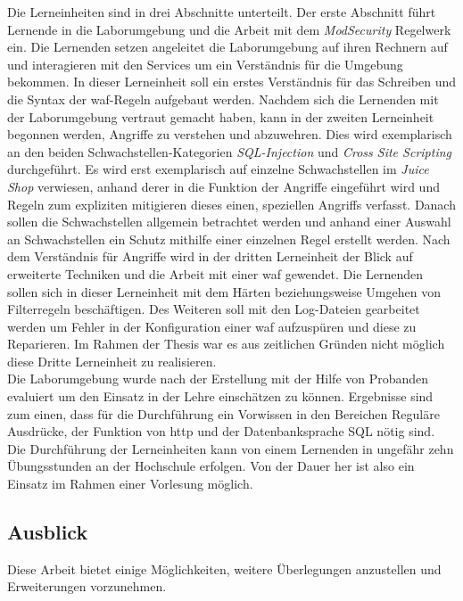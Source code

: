 Die Lerneinheiten sind in drei Abschnitte unterteilt.
Der erste Abschnitt führt Lernende in die Laborumgebung und die Arbeit mit dem \textit{ModSecurity} Regelwerk ein.
Die Lernenden setzen angeleitet die Laborumgebung auf ihren Rechnern auf und interagieren mit den Services um ein Verständnis für die Umgebung bekommen.
In dieser Lerneinheit soll ein erstes Verständnis für das Schreiben und die Syntax der \ac{waf}-Regeln aufgebaut werden.
Nachdem sich die Lernenden mit der Laborumgebung vertraut gemacht haben, kann in der zweiten Lerneinheit begonnen werden, Angriffe zu verstehen und abzuwehren.
Dies wird exemplarisch an den beiden Schwachstellen-Kategorien \textit{SQL-Injection} und \textit{Cross Site Scripting} durchgeführt.
Es wird erst exemplarisch auf einzelne Schwachstellen im \textit{Juice Shop} verwiesen, anhand derer in die Funktion der Angriffe eingeführt wird und Regeln zum expliziten mitigieren dieses einen, speziellen Angriffs verfasst.
Danach sollen die Schwachstellen allgemein betrachtet werden und anhand einer Auswahl an Schwachstellen ein Schutz mithilfe einer einzelnen Regel erstellt werden.
Nach dem Verständnis für Angriffe wird in der dritten Lerneinheit der Blick auf erweiterte Techniken und die Arbeit mit einer \ac{waf} gewendet.
Die Lernenden sollen sich in dieser Lerneinheit mit dem Härten beziehungsweise Umgehen von Filterregeln beschäftigen.
Des Weiteren soll mit den Log-Dateien gearbeitet werden um Fehler in der Konfiguration einer \ac{waf} aufzuspüren und diese zu Reparieren.
Im Rahmen der Thesis war es aus zeitlichen Gründen nicht möglich diese Dritte Lerneinheit zu realisieren.\\

Die Laborumgebung wurde nach der Erstellung mit der Hilfe von Probanden evaluiert um den Einsatz in der Lehre einschätzen zu können.
Ergebnisse sind zum einen, dass für die Durchführung ein Vorwissen in den Bereichen Reguläre Ausdrücke, der Funktion von \ac{http} und der Datenbanksprache SQL nötig sind.
Die Durchführung der Lerneinheiten kann von einem Lernenden in ungefähr zehn Übungsstunden an der Hochschule erfolgen.
Von der Dauer her ist also ein Einsatz im Rahmen einer Vorlesung möglich.

\subsection{Ausblick}

Diese Arbeit bietet einige Möglichkeiten, weitere Überlegungen anzustellen und Erweiterungen vorzunehmen.

